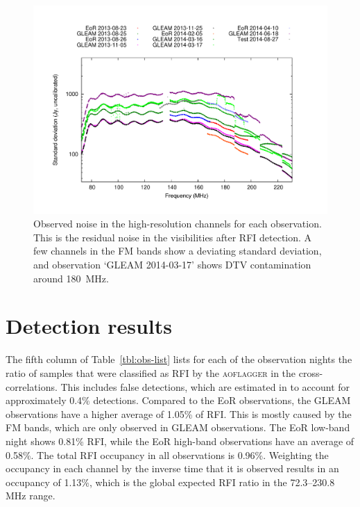 \documentclass{pasa}
\begin{document}
\noindent\begin{figure}
\begin{center}\hspace*{-0.2cm}\includegraphics[width=18cm]{img/plot-stddev-per-set}\vspace{-1cm}
\caption{Observed noise in the high-resolution channels for each observation. This is the residual noise in the visibilities after RFI detection. A few channels in the FM bands show a deviating standard deviation, and observation `GLEAM 2014-03-17' shows DTV contamination around 180~MHz.}
\label{fig:stddev-per-set}
\end{center}
\end{figure}

\section{Detection results} \label{ch:detection-results}
The fifth column of Table~\ref{tbl:obs-list} lists for each of the observation nights the ratio of samples that were classified as RFI by the \textsc{aoflagger} in the cross-correlations. This includes false detections, which are estimated in  to account for approximately 0.4\% detections. Compared to the EoR observations, the GLEAM observations have a higher average of 1.05\% of RFI. This is mostly caused by the FM bands, which are only observed in GLEAM observations. The EoR low-band night shows 0.81\% RFI, while the EoR high-band observations have an average of 0.58\%. The total RFI occupancy in all observations is 0.96\%. Weighting the occupancy in each channel by the inverse time that it is observed results in an occupancy of 1.13\%, which is the global expected RFI ratio in the 72.3--230.8 MHz range.
\end{document}
